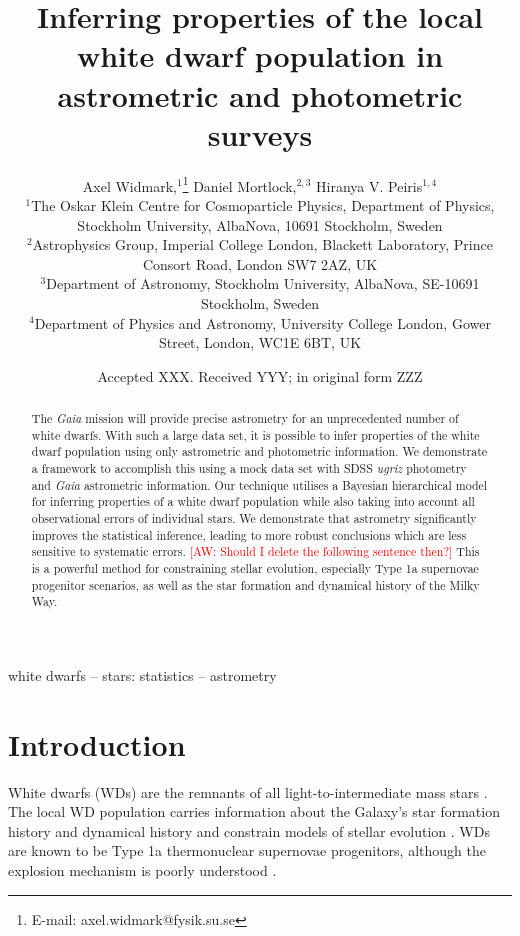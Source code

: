 \documentclass[fleqn,usenatbib]{mnras}
\title[Inferring properties of the white dwarf population]{Inferring properties of the local white dwarf population in astrometric and photometric surveys}
\author[A. Widmark et al.]{
Axel Widmark,$^1$\thanks{E-mail: axel.widmark@fysik.su.se} 
Daniel Mortlock,$^{2,3}$
Hiranya V. Peiris$^{1,4}$
\\
$^1$The Oskar Klein Centre for Cosmoparticle Physics, Department of
Physics, Stockholm University, AlbaNova, 10691 Stockholm, Sweden\\
$^2$Astrophysics Group, Imperial College London, Blackett Laboratory, Prince Consort Road, London SW7 2AZ, UK\\
$^3$Department of Astronomy, Stockholm University, AlbaNova, SE-10691 Stockholm, Sweden\\
$^4$Department of Physics and Astronomy, University College London, Gower Street, London, WC1E 6BT, UK\\
}
\date{Accepted XXX. Received YYY; in original form ZZZ}
\newcommand{\aw}[1]{\textcolor{red}{[AW: #1]}}
\begin{document}
\label{firstpage}
\pagerange{\pageref{firstpage}--\pageref{lastpage}}
\maketitle

\begin{abstract}
The \emph{Gaia} mission will provide precise astrometry for an unprecedented number of white dwarfs. With such a large data set, it is possible to infer properties of the white dwarf population using only astrometric and photometric information. We demonstrate a framework to accomplish this using a mock data set with SDSS \emph{ugriz} photometry and \emph{Gaia} astrometric information.
Our technique utilises a Bayesian hierarchical model for inferring properties of a white dwarf population while also taking into account all observational errors of individual stars. We demonstrate that astrometry significantly improves the statistical inference, leading to more robust conclusions which are less sensitive to systematic errors.
\aw{Should I delete the following sentence then?} This is a powerful method for constraining stellar evolution, especially Type 1a supernovae progenitor scenarios, as well as the star formation and dynamical history of the Milky Way.
\end{abstract}

\begin{keywords}
white dwarfs -- stars: statistics -- astrometry
\end{keywords}









\section{Introduction}

White dwarfs (WDs) are the remnants of all light-to-intermediate mass stars \citep{1996ApJ...460..489R}. The local WD population carries information about the Galaxy's star formation history and dynamical history and constrain models of stellar evolution \citep{1987ApJ...315L..77W,2016NewAR..72....1G,2018arXiv180505849E}. WDs are known to be Type 1a thermonuclear supernovae progenitors, although the explosion mechanism is poorly understood \citep{Livio:2018rue}.
\end{document}
